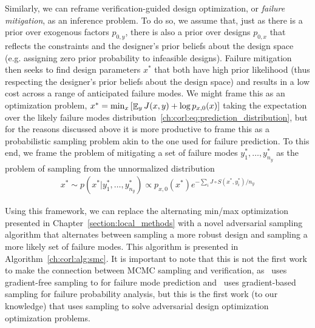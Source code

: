 {Similarly, we can reframe verification-guided design optimization, or \textit{failure mitigation}, as an inference problem. To do so, we assume that, just as there is a prior over exogenous factors $p_{0, y}$, there is also a prior over designs $p_{0, x}$ that reflects the constraints and the designer's prior beliefs about the design space (e.g. assigning zero prior probability to infeasible designs). Failure mitigation then seeks to find design parameters $x^*$ that both have high prior likelihood (thus respecting the designer's prior beliefs about the design space) and results in a low cost across a range of anticipated failure modes. We might frame this as an optimization problem, $x^* = \min_x \left[ \mathop{\mathbb{E}}_y J(x, y) + \log p_{x, 0}(x) \right]$ taking the expectation over the likely failure modes distribution~\eqref{ch:corl:eq:prediction_distribution}, but for the reasons discussed above it is more productive to frame this as a probabilistic sampling problem akin to the one used for failure prediction. To this end, we frame the problem of mitigating a set of failure modes $y^*_1, \ldots, y^*_{n_y}$ as the problem of sampling from the unnormalized distribution
\begin{align}
    x^* \sim p(x^* | y^*_1, \ldots, y^*_{n_y}) \propto p_{x, 0}(x^*) e^{-\sum_{i} J\circ S(x^*, y^*_i) / n_y} \label{ch:corl:eq:mitigation_distribution}
\end{align}

Using this framework, we can replace the alternating min/max optimization presented in Chapter~\ref{section:local_methods} with a novel adversarial sampling algorithm that alternates between sampling a more robust design and sampling a more likely set of failure modes. This algorithm is presented in Algorithm~\ref{ch:corl:alg:smc}. It is important to note that this is not the first work to make the connection between MCMC sampling and verification, as~\cite{zhouRoCUSRobotController2021} uses gradient-free sampling to for failure mode prediction and~\cite{sinhaNeuralBridgeSampling2020} uses gradient-based sampling for failure probability analysis, but this is the first work (to our knowledge) that uses sampling to solve adversarial design optimization optimization problems.

}
